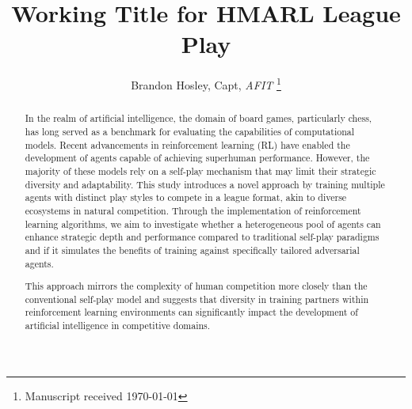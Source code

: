 \documentclass[journal]{IEEEtran}
\title{Working Title for HMARL League Play}
\author{Brandon Hosley, Capt, \textit{AFIT}%
	\thanks{Manuscript received \today%
}}
\begin{document}
	
	\maketitle
	
	
	\begin{abstract}
		
		In the realm of artificial intelligence, the domain of board games, particularly chess, 
		has long served as a benchmark for evaluating the capabilities of computational models. 
		Recent advancements in reinforcement learning (RL) have enabled the development of 
		agents capable of achieving superhuman performance. 
		However, the majority of these models rely on a self-play mechanism 
		that may limit their strategic diversity and adaptability. 
		This study introduces a novel approach by training multiple agents with distinct 
		play styles to compete in a league format, akin to diverse ecosystems in natural competition. 
		Through the implementation of reinforcement learning algorithms, 
		we aim to investigate whether a heterogeneous pool of agents can enhance strategic depth 
		and performance compared to traditional self-play paradigms and if it simulates the benefits of 
		training against specifically tailored adversarial agents. 
		\begin{comment}
		We developed several agents, each with a unique play style—aggressive, defensive, positional, and tactical—trained within a multi-agent reinforcement learning framework. 
		The performance of these agents was evaluated based on their win rates, Elo ratings, Glicko ratings, and their ability to adapt and counter a variety of opponent strategies. 
		Our results indicate that the inclusion of diverse play styles not only elevates the overall performance of individual agents in league play but also encourages the emergence of innovative strategies and adaptability.
		\end{comment}
		This approach mirrors the complexity of human competition more closely than the conventional self-play model and suggests that diversity in training partners within reinforcement learning environments can significantly impact the development of artificial intelligence in competitive domains.
		
	\end{abstract}
	
\end{document}
